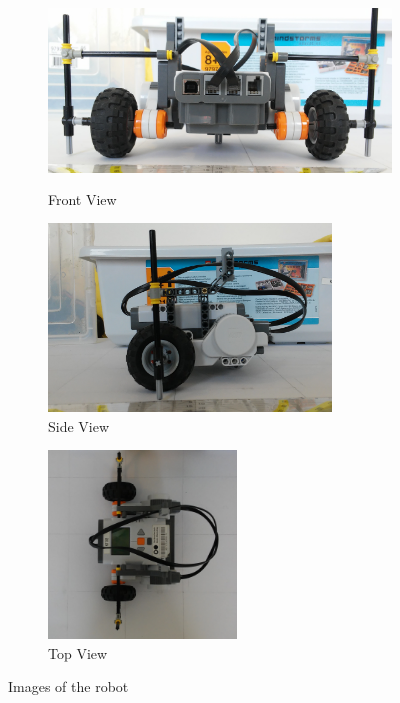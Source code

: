 \documentclass[paper=a4, fontsize=11pt]{scrartcl} %
\numberwithin{equation}{section} %
\numberwithin{figure}{section} %
\numberwithin{table}{section} %
\begin{document}
\begin{figure}[H]
 
\begin{subfigure}{0.5\textwidth}
\includegraphics[width=0.9\linewidth, height=5cm]{front.png} 
\caption{Front View}
\label{fig:sub_front}
\end{subfigure}
\begin{subfigure}{0.5\textwidth}
\includegraphics[width=0.9\linewidth, height=5cm]{side.png}
\caption{Side View}
\label{fig:sub_side}
\end{subfigure}
\begin{subfigure}{0.5\textwidth}
\includegraphics[width=0.9\linewidth, height=5cm]{top.png}
\caption{Top View}
\label{fig:sub_top}
\end{subfigure}
 
\caption{Images of the robot}
\label{fig:robot}
\end{figure}
\end{document}
